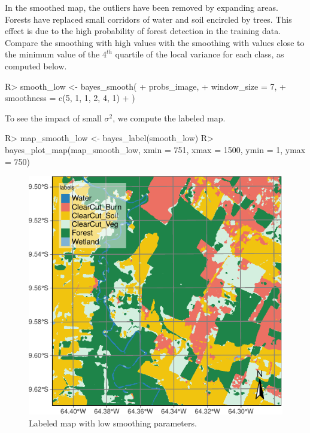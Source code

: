 \documentclass[
  shortnames]{jss}
\begin{document}
In the smoothed map, the outliers have been removed by expanding  areas. Forests have replaced small corridors of water and soil encircled by trees. This effect is due to the high probability of forest detection in the training data. Compare the smoothing with high values with the smoothing with values close to the minimum value of the \(4^{th}\) quartile of the local variance for each class, as computed below.

\begin{CodeChunk}
\begin{CodeInput}
R> smooth_low <- bayes_smooth(
+     probs_image,
+     window_size = 7,
+     smoothness = c(5, 1, 1, 2, 4, 1)
+ )
\end{CodeInput}
\end{CodeChunk}

To see the impact of small \(\sigma^2\), we compute the labeled map.

\begin{CodeChunk}
\begin{CodeInput}
R> map_smooth_low <- bayes_label(smooth_low)
R> bayes_plot_map(map_smooth_low, xmin = 751, xmax = 1500, ymin = 1, ymax = 750)
\end{CodeInput}
\begin{figure}[h]

{\centering \includegraphics{Bayesian_smoothing_JSS_files/figure-latex/smth2-1} 

}

\caption[Labeled map with low smoothing parameters]{Labeled map with low smoothing parameters.}\label{fig:smth2}
\end{figure}
\end{CodeChunk}
\end{document}
